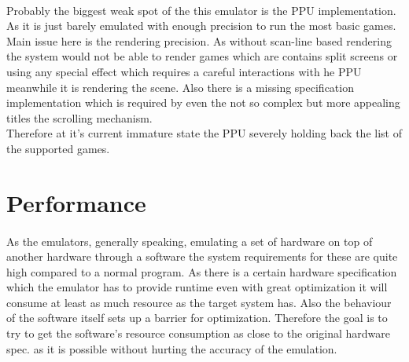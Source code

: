\documentclass[]{report}
\begin{document}
\paragraph{ }
Probably the biggest weak spot of the this emulator is the PPU implementation. As it is just barely emulated with enough precision to run the most basic games. Main issue here is the rendering precision. As without scan-line based rendering the system would not be able to render games which are contains split screens or using any special effect which requires a careful interactions with he PPU meanwhile it is rendering the scene. Also there is a missing specification implementation which is required by even the not so complex but more appealing titles the scrolling mechanism.
\\
Therefore at it's current immature state the PPU severely holding back the list of the supported games.

\section{Performance}
\paragraph{ }
As the emulators, generally speaking, emulating a set of hardware on top of another hardware through a software the system requirements for these are quite high compared to a normal program. As there is a certain hardware specification which the emulator has to provide runtime even with great optimization it will consume at least as much resource as the target system has. Also the behaviour of the software itself sets up a barrier for optimization. Therefore the goal is to try to get the software's resource consumption as close to the original hardware spec. as it is possible without hurting the accuracy of the emulation.
\end{document}
